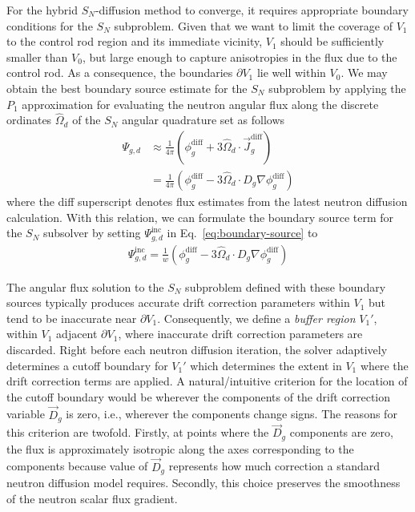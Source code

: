 \documentclass[letterpaper]{mc2025}
\begin{document}
For the hybrid $S_N$-diffusion method to converge, it requires appropriate boundary conditions for
the $S_N$ subproblem.
Given that we want to limit the coverage of $V_1$ to the control rod region and its
immediate vicinity, $V_1$ should be sufficiently smaller than $V_0$, but large enough to capture
anisotropies in the flux due to the control rod. As a consequence, the boundaries $\partial V_1$ 
lie well within $V_0$. We may obtain the best boundary source estimate for the $S_N$ subproblem by
applying the $P_1$ approximation for evaluating the neutron angular flux along
the discrete ordinates $\hat{\Omega}_d$ of the $S_N$ angular quadrature set as follows
%
\begin{align}
  \Psi_{g,d} &\approx \frac{1}{4\pi}\left(\phi^\text{diff}_g+3\hat{\Omega}_d\cdot
  \vec{J}^\text{diff}_g\right) \nonumber \\
  &=\frac{1}{4\pi}\left(\phi^\text{diff}_g-3\hat{\Omega}_d\cdot D_g\nabla\phi^\text{diff}_g\right)
\end{align}
%
where the diff superscript denotes flux estimates from the latest neutron diffusion calculation.
With this relation, we can formulate the boundary source term for the $S_N$ subsolver by setting
$\Psi^\text{inc}_{g,d}$ in Eq.\ \ref{eq:boundary-source} to
%
\begin{gather}
  \Psi^\text{inc}_{g,d} = \frac{1}{w}
  \left(\phi^\text{diff}_g-3\hat{\Omega}_d\cdot D_g\nabla\phi^\text{diff}_g\right)
\end{gather}

The angular flux solution to the $S_N$ subproblem defined with these boundary sources typically
produces accurate drift correction parameters within $V_1$ but tend to be inaccurate
near $\partial V_1$. Consequently, we define a \textit{buffer region}
$V_1'$, within $V_1$ adjacent $\partial V_1$, where inaccurate drift correction parameters are
discarded. Right before each
neutron diffusion iteration, the solver adaptively determines a cutoff boundary for $V_1'$ which
determines the extent in $V_1$ where the drift correction terms are applied.
A natural/intuitive criterion for the location of the cutoff boundary
would be wherever the components of the drift correction variable $\vec{D}_g$ is zero, i.e.,
wherever the components change signs. The reasons for this criterion are twofold. Firstly, at
points where the $\vec{D}_g$ components are zero, the flux is approximately isotropic along the
axes corresponding to the components because value of $\vec{D}_g$ represents how much correction a
standard neutron diffusion model requires. Secondly, this choice preserves the smoothness of the
neutron scalar flux gradient. 
\end{document}
